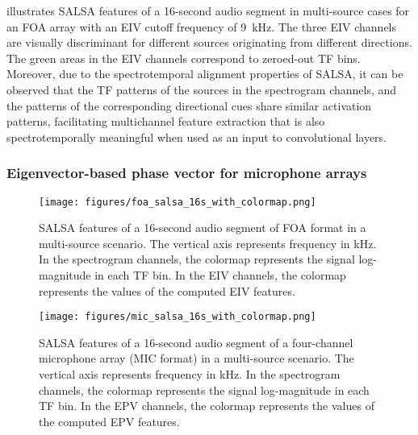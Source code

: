 \documentclass[journal]{IEEEtran}
\begin{document}
 illustrates SALSA features of a \num{16}-second audio segment in multi-source cases for an FOA array with an EIV cutoff frequency of \SI{9}{\kilo\hertz}. The three EIV channels are visually discriminant for different sources originating from different directions. The green areas in the EIV channels correspond to zeroed-out TF bins. Moreover, due to the spectrotemporal alignment properties of SALSA, it can be observed that the TF patterns of the sources in the spectrogram channels, and the patterns of the corresponding directional cues share similar activation patterns, facilitating multichannel feature extraction that is also spectrotemporally meaningful when used as an input to convolutional layers.

\subsubsection{Eigenvector-based phase vector for microphone arrays}
\label{subsec:epv}

\begin{figure}[tb]
    \centering
    \texttt{[image: figures/foa\_salsa\_16s\_with\_colormap.png]}
    \vspace{-0.5cm}
    \caption{SALSA features of a 16-second audio segment of FOA format in a multi-source scenario. 
    The vertical axis represents frequency in kHz. In the spectrogram channels, the colormap represents the signal log-magnitude in each TF bin. In the EIV channels, the colormap represents the values of the computed EIV features.}
    \label{fig:foa_salsa}
\end{figure} 

\begin{figure}[tb]
    \centering
    \texttt{[image: figures/mic\_salsa\_16s\_with\_colormap.png]}
    \vspace{-0.5cm}
    \caption{SALSA features of a 16-second audio segment of a four-channel microphone array (MIC format) in a multi-source scenario. The vertical axis represents frequency in kHz. In the spectrogram channels, the colormap represents the signal log-magnitude in each TF bin. In the EPV channels, the colormap represents the values of the computed EPV features.}
    \label{fig:mic_salsa}
\end{figure} 
\end{document}
